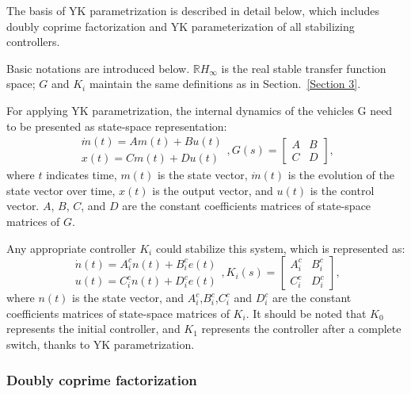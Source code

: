 \documentclass[trsc,nonblindrev]{informs3} %
\begin{document}
The basis of YK parametrization is described in detail below, which includes doubly coprime factorization and YK parameterization of all stabilizing controllers.

Basic notations are introduced below. $\mathbb{R} H_{\infty}$ is the real stable transfer function space; $G$ and $K_i$ maintain the same definitions as in Section.~\ref{Section 3}.

For applying YK parametrization, the internal dynamics of the vehicles G need to be presented as state-space representation:
\begin{equation}
    \begin{gathered}
        \dot{m}(t)=A m(t)+B u(t) \\
        x(t)=C m(t)+D u(t)
    \end{gathered}, G(s)=\left[\begin{array}{ll}
            A & B \\
            C & D
        \end{array}\right],
\end{equation}
where $t$ indicates time, $m(t)$ is the state vector, $\dot{m}(t)$ is the evolution of the state vector over time, $x(t)$ is the output vector, and $u(t)$ is the control vector. $A$, $B$, $C$, and $D$ are the constant coefficients matrices of state-space matrices of $G$.

Any appropriate controller $K_i$ could stabilize this system, which is represented as:
\begin{equation}
    \begin{gathered}
        \dot{n}(t)=A_{i}^{c} n(t)+B_{i}^{c} e(t) \\
        u(t)=C_{i}^{c} n(t)+D_{i}^{c} e(t)
    \end{gathered}, K_{i}(s)=\left[\begin{array}{ll}
            A_{i}^{c} & B_{i}^{c} \\
            C_{i}^{c} & D_{i}^{c}
        \end{array}\right],
\end{equation}
where $n(t)$ is the state vector, and $A_i^c$,$B_i^c$,$C_i^c$ and $D_i^c$ are the constant coefficients matrices of state-space matrices of $K_i$. It should be noted that $K_0$ represents the initial controller, and $K_1$ represents the controller after a complete switch, thanks to YK parametrization.

\subsubsection{Doubly coprime factorization}
\label{Section 3.2.2}
\end{document}
